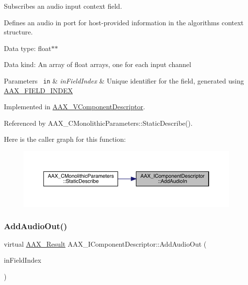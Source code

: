 Subscribes an audio input context field. 

Defines an audio in port for host-\/provided information in the algorithm\textquotesingle{}s context structure.


\begin{DoxyItemize}
\item Data type\+: float$\ast$$\ast$
\item Data kind\+: An array of float arrays, one for each input channel
\end{DoxyItemize}


\begin{DoxyParams}[1]{Parameters}
\mbox{\texttt{ in}}  & {\em in\+Field\+Index} & Unique identifier for the field, generated using \mbox{\hyperlink{a00392_acf807247ecd6e5899dc9dc31644e9a1d}{A\+A\+X\+\_\+\+F\+I\+E\+L\+D\+\_\+\+I\+N\+D\+EX}} \\
\hline
\end{DoxyParams}


Implemented in \mbox{\hyperlink{a01901_a612fab50f30f1595bdba9aa001344b44}{A\+A\+X\+\_\+\+V\+Component\+Descriptor}}.



Referenced by A\+A\+X\+\_\+\+C\+Monolithic\+Parameters\+::\+Static\+Describe().

Here is the caller graph for this function\+:
\nopagebreak
\begin{figure}[H]
\begin{center}
\leavevmode
\includegraphics[width=350pt]{a01781_a5fad32eff268756c9b4309431321f9b3_icgraph}
\end{center}
\end{figure}
\mbox{\label{a01781_afea50c52b3c2e68eef2857b75859a954}} 
\subsubsection{\texorpdfstring{AddAudioOut()}{AddAudioOut()}}
{\footnotesize\ttfamily virtual \mbox{\hyperlink{a00392_a4d8f69a697df7f70c3a8e9b8ee130d2f}{A\+A\+X\+\_\+\+Result}} A\+A\+X\+\_\+\+I\+Component\+Descriptor\+::\+Add\+Audio\+Out (\begin{DoxyParamCaption}\item[{\mbox{\hyperlink{a00392_ae807f8986143820cfb5d6da32165c9c7}{A\+A\+X\+\_\+\+C\+Field\+Index}}}]{in\+Field\+Index }\end{DoxyParamCaption})\hspace{0.3cm}{\ttfamily [pure virtual]}}



